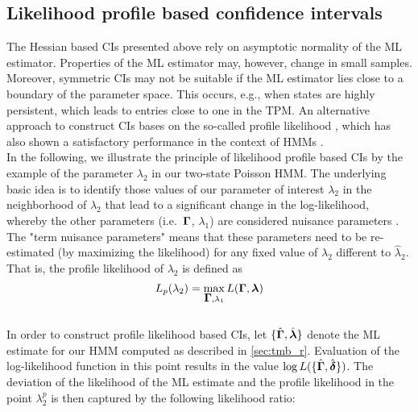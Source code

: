 \documentclass[bimj,fleqn]{w-art}\usepackage[]{graphicx}\usepackage[]{color}
\newcommand{\bgamma}{\mbox{\boldmath $\Gamma$}}
\newcommand{\bfdelta}{\mbox{\boldmath $\delta$}}
\newcommand{\bflambda}{\mbox{\boldmath $\lambda$}}
\theoremstyle{plain}
\theoremstyle{definition}
\begin{document}



\subsection{Likelihood profile based confidence intervals}
\label{sec:likelihood}

The Hessian based CIs presented above rely on asymptotic normality of the ML estimator. Properties of the ML estimator may, however, change in small samples. Moreover, symmetric CIs may not be suitable if the ML estimator lies close to a boundary of the parameter space. This occurs, e.g., when states are highly persistent, which leads to entries close to one in the TPM. An alternative approach to construct CIs bases on the so-called profile likelihood \citep[see, e.g.,][]{venzon, meeker}, which has also shown a satisfactory performance in the context of HMMs \citep{visser}.\\
In the following, we illustrate the principle of likelihood profile based CIs by the example of the parameter $\lambda_2$ in our two-state Poisson HMM. The underlying basic idea is to identify those values of our parameter of interest $\lambda_2$ in the neighborhood of $\hat \lambda_2$ that lead to a significant change in the log-likelihood, whereby the other parameters (i.e.~$\bgamma$, $\lambda_1$) are considered nuisance parameters \citep{meeker}. The "term nuisance parameters" means that these parameters need to be re-estimated (by maximizing the likelihood) for any fixed value of $\lambda_2$ different to $\hat \lambda_2$. That is, the profile likelihood of $\lambda_2$ is defined as
\begin{equation*}
L_p(\lambda_2) = \max_{\bgamma, \lambda_1} L(\bgamma, \bflambda)
\end{equation*}
\\
In order to construct profile likelihood based CIs, let $\{\hat{\bgamma}, \hat{\bflambda}\}$ denote the ML estimate for our HMM computed as described in \autoref{sec:tmb_r}. Evaluation of the log-likelihood function in this point results in the value $\log L(\{\hat{\bgamma}, \hat{\bfdelta}\})$. The deviation of the likelihood of the ML estimate and the profile likelihood in the point $\lambda_2^p$ is then captured by the following likelihood ratio:
\end{document}
